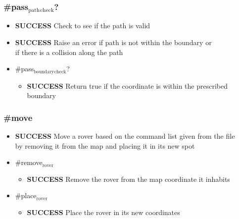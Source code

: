 \documentclass{article}
\begin{document}
\subsubsection{\#pass$_{\mathrm{path}}$$_{\mathrm{check}}$?}
\label{sec-9-2-2}
\begin{itemize}

\item \textbf{SUCCESS} Check to see if the path is valid\\
\label{sec-9-2-2-1}%
\item \textbf{SUCCESS} Raise an error if path is not within the boundary or\\
\label{sec-9-2-2-2}%
if there is a collision along the path

\item \#pass$_{\mathrm{boundary}}$$_{\mathrm{check}}$?
\label{sec-9-2-2-3}%
\begin{itemize}

\item \textbf{SUCCESS} Return true if the coordinate is within the prescribed boundary\\
\label{sec-9-2-2-3-1}%
\end{itemize} %
\end{itemize} %
\subsubsection{\#move}
\label{sec-9-2-3}
\begin{itemize}

\item \textbf{SUCCESS} Move a rover based on the command list given from the file\\
\label{sec-9-2-3-1}%
by removing it from the map and placing it in its new spot

\item \#remove$_{\mathrm{rover}}$
\label{sec-9-2-3-2}%
\begin{itemize}

\item \textbf{SUCCESS} Remove the rover from the map coordinate it inhabits\\
\label{sec-9-2-3-2-1}%
\end{itemize} %

\item \#place$_{\mathrm{rover}}$
\label{sec-9-2-3-3}%
\begin{itemize}

\item \textbf{SUCCESS} Place the rover in its new coordinates\\
\label{sec-9-2-3-3-1}%
\end{itemize} %
\end{itemize} %
\end{document}
